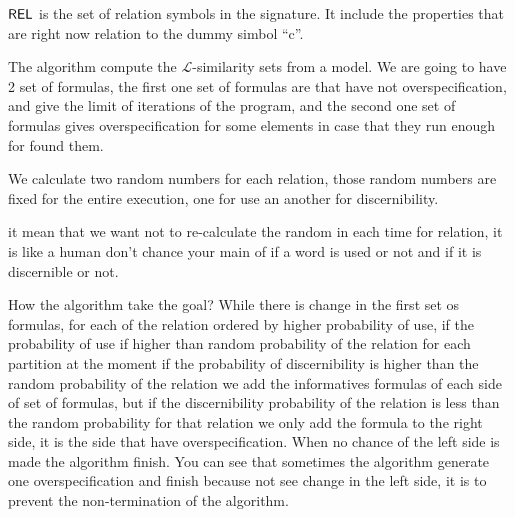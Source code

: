 $\textsf{REL}$ is the set of relation symbols in the signature. It include the properties that are right now relation to the dummy simbol ``c''. 


The algorithm compute the $\mathcal{L}$-similarity sets from a model. 
We are going to have 2 set of formulas, the first one set of formulas are that have not overspecification, and give the limit of iterations of the program, and the second one set of formulas gives overspecification for some elements in case that they run enough for found them.

We calculate two random numbers for each relation, those random numbers are fixed for the entire execution, one for use an another for discernibility. 

it mean that we want not to re-calculate the random in each time for relation, it is like a human don't chance your main of if a word is used or not and if it is discernible or not.

How the algorithm take the goal?
While there is change in the first set os formulas, for each of the relation ordered by higher probability of use, if the probability of use if higher than random probability of the relation for each partition at the moment if the probability of discernibility is higher than the random probability of the relation we add the informatives formulas of each side of set of formulas, but if the discernibility probability of the relation is less than the random probability for that relation we only add the formula to the right side, it is the side that have overspecification.
When no chance of the left side is made the algorithm finish. You can see that sometimes the algorithm generate one overspecification and finish because not see change in the left side, it is to prevent the non-termination of the algorithm.



